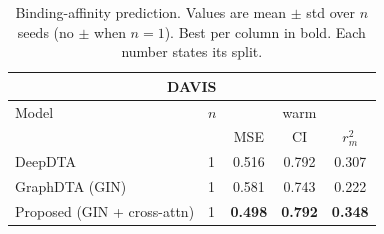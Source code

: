 \begin{table}[t]
\centering
\caption{Binding-affinity prediction. Values are mean $\pm$ std over $n$ seeds (no $\pm$ when $n=1$). Best per column in bold. Each number states its split.}
\label{tab:main_results}
\small
\begin{tabular}{llccc}
\toprule
\multicolumn{5}{c}{\textbf{DAVIS}} \\
\midrule
Model & $n$ & \multicolumn{3}{c}{warm} \\
 & & MSE & CI & $r_m^2$ \\
\midrule
DeepDTA & 1 & 0.516 & 0.792 & 0.307 \\
GraphDTA (GIN) & 1 & 0.581 & 0.743 & 0.222 \\
Proposed (GIN + cross-attn) & 1 & \textbf{0.498} & \textbf{0.792} & \textbf{0.348} \\
\bottomrule
\end{tabular}

\end{table}